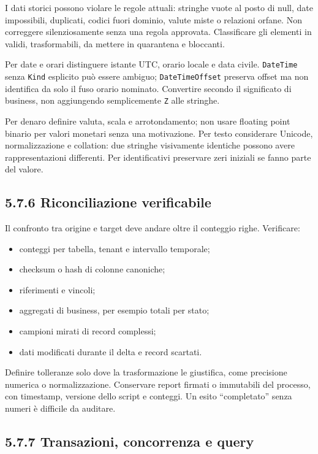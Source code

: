 \documentclass[
  italian,
  10pt,
]{book}
\providecommand{\tightlist}{%
  \setlength{\itemsep}{0pt}\setlength{\parskip}{0pt}}
\begin{document}
I dati storici possono violare le regole attuali: stringhe vuote al
posto di null, date impossibili, duplicati, codici fuori dominio, valute
miste o relazioni orfane. Non correggere silenziosamente senza una
regola approvata. Classificare gli elementi in validi, trasformabili, da
mettere in quarantena e bloccanti.

Per date e orari distinguere istante UTC, orario locale e data civile.
\texttt{DateTime} senza \texttt{Kind} esplicito può essere ambiguo;
\texttt{DateTimeOffset} preserva offset ma non identifica da solo il
fuso orario nominato. Convertire secondo il significato di business, non
aggiungendo semplicemente \texttt{Z} alle stringhe.

Per denaro definire valuta, scala e arrotondamento; non usare floating
point binario per valori monetari senza una motivazione. Per testo
considerare Unicode, normalizzazione e collation: due stringhe
visivamente identiche possono avere rappresentazioni differenti. Per
identificativi preservare zeri iniziali se fanno parte del valore.

\subsection{5.7.6 Riconciliazione
verificabile}\label{riconciliazione-verificabile}

Il confronto tra origine e target deve andare oltre il conteggio righe.
Verificare:

\begin{itemize}
\tightlist
\item
  conteggi per tabella, tenant e intervallo temporale;
\item
  checksum o hash di colonne canoniche;
\item
  riferimenti e vincoli;
\item
  aggregati di business, per esempio totali per stato;
\item
  campioni mirati di record complessi;
\item
  dati modificati durante il delta e record scartati.
\end{itemize}

Definire tolleranze solo dove la trasformazione le giustifica, come
precisione numerica o normalizzazione. Conservare report firmati o
immutabili del processo, con timestamp, versione dello script e
conteggi. Un esito ``completato'' senza numeri è difficile da auditare.

\subsection{5.7.7 Transazioni, concorrenza e
query}\label{transazioni-concorrenza-e-query}
\end{document}
